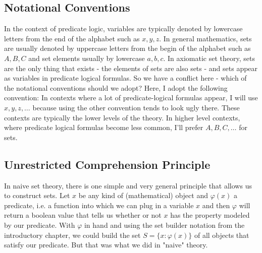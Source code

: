\subsection{Notational Conventions}  In the context of predicate logic, variables are typically denoted by lowercase letters from the end of the alphabet such as $x,y,z$. In general mathematics, sets are usually denoted by uppercase letters from the begin of the alphabet such as $A,B,C$ and set elements usually by lowercase $a,b,c$. In axiomatic set theory, sets are the only thing that exists - the elements of sets are also sets - and sets appear as variables in predicate logical formulas. So we have a conflict here - which of the notational conventions should we adopt? Here, I adopt the following convention: In contexts where a lot of predicate-logical formulas appear, I will use $x,y,z, \ldots$ because using the other convention tends to look ugly there. These contexts are typically the lower levels of the theory. In higher level contexts, where predicate logical formulas become less common, I'll prefer  $A,B,C, \ldots$ for sets.

\subsection{Unrestricted Comprehension Principle}
In naive set theory, there is one simple and very general principle that allows us to construct sets. Let $x$ be any kind of (mathematical) object and $\varphi(x)$ a predicate, i.e. a function into which we can plug in a variable $x$ and then $\varphi$ will return a boolean value that tells us whether or not $x$ has the property modeled by our predicate. With $\varphi$ in hand and using the set builder notation from the introductory chapter, we could build the set $S = \{x: \varphi(x)\}$ of all objects that satisfy our predicate. But that was what we did in "naive" theory.


